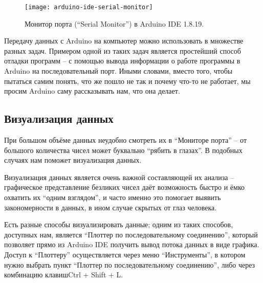 \documentclass[../sparc.tex]{subfiles}
\begin{document}
\begin{figure}[ht]
  \centering
  \texttt{[image: arduino-ide-serial-monitor]}
  \caption{Монитор порта (``Serial Monitor'') в Arduino IDE 1.8.19.}
  \label{fig:arduino-ide-serial-monitor}
\end{figure}

Передачу данных с Arduino на компьютер можно использовать в множестве разных
задач. Примером одной из таких задач является простейший способ отладки программ
-- с помощью вывода информации о работе программы в Arduino на последовательный
порт. Иными словами, вместо того, чтобы пытаться самим понять, что же пошло не
так и почему что-то не работает, мы просим Arduino саму рассказывать нам, что
она делает.

\subsection{Визуализация данных}

При большом объёме данных неудобно смотреть их в ``Мониторе порта'' -- от
большого количества чисел может буквально ``рябить в глазах''.  В подобных
случаях нам поможет визуализация данных.

Визуализация данных является очень важной составляющей их анализа -- графическое
представление безликих чисел даёт возможность быстро и ёмко охватить их ``одним
взглядом'', и часто именно это помогает выявить закономерности в данных, в ином
случае скрытых от глаз человека.

Есть разные способы визуализировать данные; одним из таких способов, доступных
нам, является ``Плоттер по последовательному соединению'', который позволяет
прямо из Arduino IDE получить вывод потока данных в виде графика.  Доступ к
``Плоттеру'' осуществляется через меню ``Инструменты'', в котором нужно выбрать
пункт ``Плоттер по последовательному соединению'', либо через комбинацию \hotkey
клавиш{Ctrl + Shift + L}.
\end{document}
